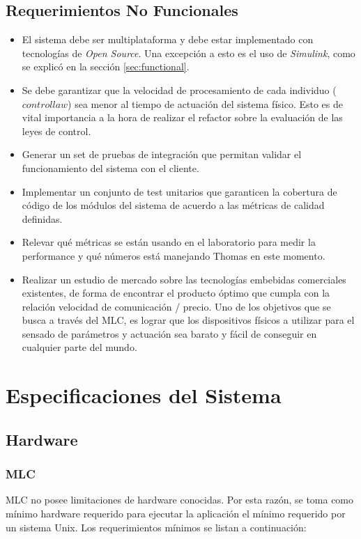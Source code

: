 \documentclass[a4paper,10pt]{article}
\begin{document}
    \subsection{Requerimientos No Funcionales} \label{sec:no_functional}
        \begin{itemize}
            \item El sistema debe ser multiplataforma y debe estar implementado con tecnologías de \textit{Open Source}. Una excepción a 
            esto es el uso de \textit{Simulink}, como se explicó en la sección \ref{sec:functional}.
        \item Se debe garantizar que la velocidad de procesamiento de cada individuo ($\mathit{control law}$) sea menor al tiempo de 
            actuación del sistema físico. Esto es de vital importancia a la hora de realizar el refactor sobre la evaluación de las leyes
            de control.
            \item Generar un set de pruebas de integración que permitan validar el funcionamiento del sistema con el cliente.
            \item Implementar un conjunto de test unitarios que garanticen la cobertura de código de los módulos del sistema de acuerdo
            a las métricas de calidad definidas.
            \item Relevar qué métricas se están usando en el laboratorio para medir la performance y qué números está manejando Thomas en
            este momento.
            \item Realizar un estudio de mercado sobre las tecnologías embebidas comerciales existentes, de forma de encontrar el producto
            óptimo que cumpla con la relación velocidad de comunicación / precio. Uno de los objetivos que se busca a través del MLC, es 
            lograr que los dispositivos físicos a utilizar para el sensado de parámetros y actuación sea barato y fácil de conseguir
            en cualquier parte del mundo. 
        \end{itemize}

    \newpage
    \section{Especificaciones del Sistema}
    \subsection{Hardware}
    \subsubsection{MLC}
        MLC no posee limitaciones de hardware conocidas. Por esta razón, se toma como mínimo hardware requerido para ejecutar la
        aplicación el mínimo requerido por un sistema Unix. Los requerimientos mínimos se listan a continuación:
\end{document}
